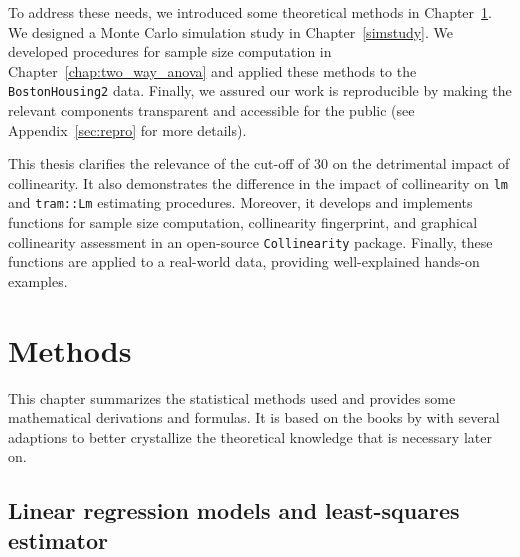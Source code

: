 \documentclass[11pt,a4paper,twoside]{book}\usepackage[]{graphicx}\usepackage[]{xcolor}
\begin{document}
To address these needs, we introduced some theoretical methods in Chapter~\ref{chap:methods}.
We designed a Monte Carlo simulation study in Chapter~\ref{simstudy}.
We developed procedures for sample size computation in Chapter~\ref{chap:two_way_anova} and applied these methods to the \texttt{BostonHousing2} data.
Finally, we assured our work is reproducible by making the relevant components transparent and accessible for the public (see Appendix~\ref{sec:repro} for more details).

This thesis clarifies the relevance of the cut-off of 30 on the detrimental impact of collinearity.
It also demonstrates the difference in the impact of collinearity on \texttt{lm} and \texttt{tram::Lm} estimating procedures.
Moreover, it develops and implements functions for sample size computation, collinearity fingerprint, and graphical collinearity assessment in an open-source \texttt{Collinearity} package.
Finally, these functions are applied to a real-world data, providing well-explained hands-on examples.







\chapter{Methods}\label{chap:methods}
This chapter summarizes the statistical methods used and provides some mathematical derivations and formulas.
It is based on the books by \cite{montgomery, Draper1998,Held2020} with several adaptions to better crystallize the theoretical knowledge that is necessary later on.

\section{Linear regression models and least-squares estimator}\label{sec:least_squares}
\end{document}
